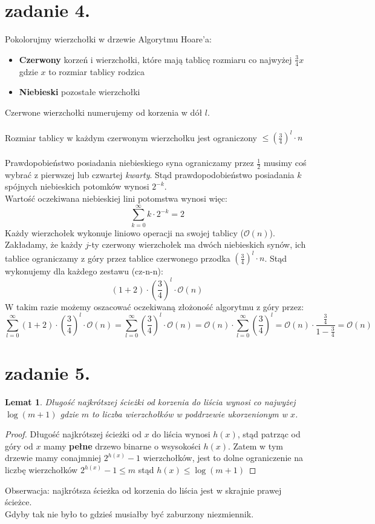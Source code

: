 \documentclass{article}
\newtheorem{lemma}{Lemat}
\begin{document}
\section{zadanie 4.}
Pokolorujmy wierzchołki w drzewie Algorytmu Hoare'a:
\begin{itemize}
  \item \textbf{Czerwony} korzeń i wierzchołki, które mają tablicę rozmiaru co najwyżej $\frac 3 4 x$ gdzie $x$ to rozmiar tablicy rodzica
  \item \textbf{Niebieski} pozostałe wierzchołki
\end{itemize}
Czerwone wierzchołki numerujemy od korzenia w dół $l$.\\\\
Rozmiar tablicy w każdym czerwonym wierzchołku jest ograniczony $\leq \left ( \frac{3}{4}\right)^l\cdot n$\\\\
Prawdopobieństwo posiadania niebieskiego syna ograniczamy przez $\frac 1 2$ musimy coś wybrać z pierwszej lub czwartej \textit{kwarty}. Stąd prawdopodobieństwo posiadania $k$ spójnych niebieskich potomków wynosi $2^{-k}$.\\Wartość oczekiwana niebieskiej lini potomstwa wynosi więc:
$$
\sum_{k=0}^{\infty} k \cdot 2^{-k} = 2
$$
Każdy wierzchołek wykonuje liniowo operacji na swojej tablicy ($\mathcal{O}(n)$).\\Zakładamy, że każdy $j$-ty czerwony wierzchołek ma dwóch niebieskich synów, ich tablice ograniczamy z góry przez tablice czerwonego przodka $\left ( \frac{3}{4}\right)^l\cdot n$. Stąd wykonujemy dla każdego zestawu (cz-n-n):
$$
(1+2)\cdot \left( \frac{3}{4}\right)^l\cdot \mathcal{O}(n)
$$
W takim razie możemy oszacować oczekiwaną złożoność algorytmu z góry przez:
$$
\sum_{l=0}^{\infty} (1+2)\cdot \left( \frac{3}{4}\right)^l\cdot \mathcal{O}(n) = \sum_{l=0}^{\infty} \left( \frac{3}{4}\right)^l\cdot \mathcal{O}(n) = \mathcal{O}(n) \cdot \sum_{l=0}^{\infty} \left( \frac{3}{4}\right)^l = \mathcal{O}(n) \cdot \frac{\frac{3}{4}}{1-\frac{3}{4}} = \mathcal{O}(n)
$$
\clearpage
\section{zadanie 5.}
\begin{lemma}
Długość najkrótszej ścieżki od korzenia do liścia wynosi co najwyżej $\log{(m+1)}$ gdzie $m$ to liczba wierzchołków w poddrzewie ukorzenionym w $x$.
\end{lemma}
\begin{proof}
Długość najkrótszej ścieżki od $x$ do liścia wynosi $h(x)$, stąd patrząc od góry od $x$ mamy \textbf{pełne} drzewo binarne o wsysokości $h(x)$. Zatem w tym drzewie mamy conajmniej $2^{h(x)}-1$ wierzchołków, jest to dolne ograniczenie na liczbę wierzchołków $2^{h(x)} - 1 \leq m$ stąd $h(x) \leq \log{(m+1)}$
\end{proof}
Obserwacja: najkrótsza ścieżka od korzenia do liścia jest w skrajnie prawej ścieżce.\\
Gdyby tak nie było to gdzieś musiałby być zaburzony niezmiennik.\\
\end{document}
